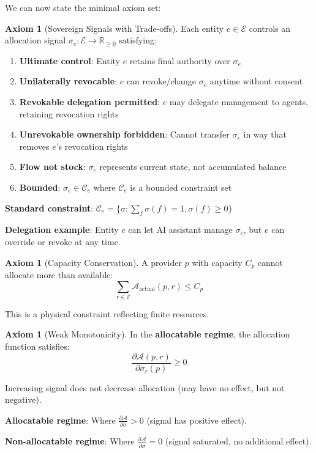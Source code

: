 \documentclass[11pt,a4paper]{article}
\theoremstyle{definition}
\newtheorem{axiom}[theorem]{Axiom}
\theoremstyle{remark}
\newcommand{\E}{\mathcal{E}}
\newcommand{\A}{\mathcal{A}}
\newcommand{\C}{\mathcal{C}}
\begin{document}
We can now state the minimal axiom set:

\begin{axiom}[Sovereign Signals with Trade-offs]
\label{ax:sovereignty}
Each entity $e \in \E$ controls an allocation signal $\sigma_e: \E \to \mathbb{R}_{\ge 0}$ satisfying:
\begin{enumerate}
\item \textbf{Ultimate control}: Entity $e$ retains final authority over $\sigma_e$
\item \textbf{Unilaterally revocable}: $e$ can revoke/change $\sigma_e$ anytime without consent
\item \textbf{Revokable delegation permitted}: $e$ may delegate management to agents, retaining revocation rights
\item \textbf{Unrevokable ownership forbidden}: Cannot transfer $\sigma_e$ in way that removes $e$'s revocation rights
\item \textbf{Flow not stock}: $\sigma_e$ represents current state, not accumulated balance
\item \textbf{Bounded}: $\sigma_e \in \C_e$ where $\C_e$ is a bounded constraint set
\end{enumerate}

\textbf{Standard constraint}: $\C_e = \{\sigma : \sum_f \sigma(f) = 1, \sigma(f) \ge 0\}$

\textbf{Delegation example}: Entity $e$ can let AI assistant manage $\sigma_e$, but $e$ can override or revoke at any time.
\end{axiom}

\begin{axiom}[Capacity Conservation]
\label{ax:conservation}
A provider $p$ with capacity $C_p$ cannot allocate more than available:
\[ \sum_{r \in \E} \A_{\text{actual}}(p,r) \le C_p \]

This is a physical constraint reflecting finite resources.
\end{axiom}

\begin{axiom}[Weak Monotonicity]
\label{ax:monotonicity}
In the \textbf{allocatable regime}, the allocation function satisfies:
\[ \frac{\partial \A(p,r)}{\partial \sigma_r(p)} \ge 0 \]

Increasing signal does not decrease allocation (may have no effect, but not negative).

\textbf{Allocatable regime}: Where $\frac{\partial \A}{\partial \sigma} > 0$ (signal has positive effect).

\textbf{Non-allocatable regime}: Where $\frac{\partial \A}{\partial \sigma} = 0$ (signal saturated, no additional effect).
\end{axiom}
\end{document}
